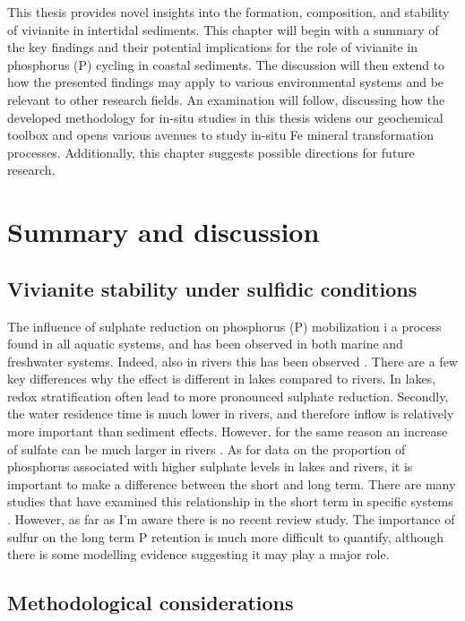 \documentclass[12pt,twoside]{book}
\begin{document}
This thesis provides novel insights into the formation, composition, and stability of vivianite in intertidal
sediments. This chapter will begin with a summary of the key findings and their potential implications for the
role of vivianite in phosphorus (P) cycling in coastal sediments. The discussion will then extend to how the
presented findings may apply to various environmental systems and be relevant to other research fields. An
examination will follow, discussing how the developed methodology for in-situ studies in this thesis widens
our geochemical toolbox and opens various avenues to study in-situ Fe mineral transformation processes.
Additionally, this chapter suggests possible directions for future research.

\section{Summary and discussion}\label{summary-and-discussion}

\subsection{Vivianite stability under sulfidic conditions}\label{vivianite-stability-under-sulfidic-conditions}

The influence of sulphate reduction on phosphorus (P) mobilization i a process found in all aquatic systems, and has been observed in both marine and freshwater systems. Indeed, also in rivers this has been observed \citep{Zak2006}. There are a few key differences why the effect is different in lakes compared to rivers. In lakes, redox stratification often lead to more pronounced sulphate reduction. Secondly, the water residence time is much lower in rivers, and therefore inflow is relatively more important than sediment effects. However, for the same reason an increase of sulfate can be much larger in rivers \citep{Kommana2023}.
As for data on the proportion of phosphorus associated with higher sulphate levels in lakes and rivers, it is important to make a difference between the short and long term. There are many studies that have examined this relationship in the short term in specific systems \citep[e.g.][]{Roden1997, Chen2016, Zhao2021} . However, as far as I'm aware there is no recent review study. The importance of sulfur on the long term P retention is much more difficult to quantify, although there is some modelling evidence \citep{Katsev2006} suggesting it may play a major role.

\subsection{Methodological considerations}\label{methodological-considerations}
\end{document}
